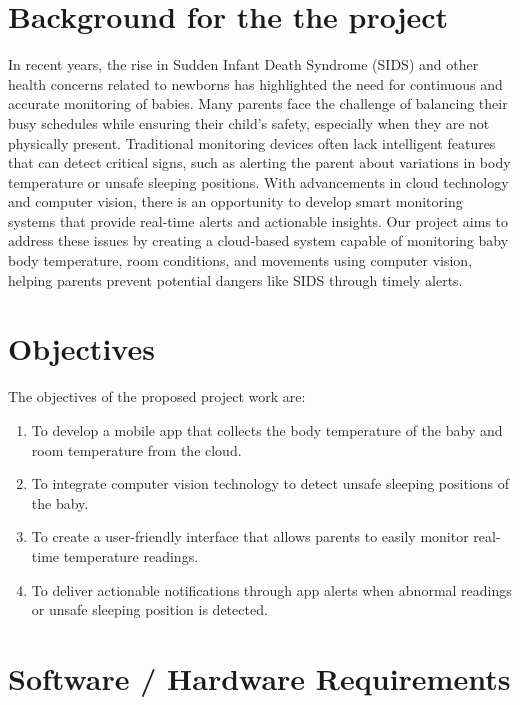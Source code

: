 \documentclass[12pt,a4paper]{report}
\begin{document}
\section*{Background for the  the project}
In recent years, the rise in Sudden Infant Death Syndrome (SIDS)
 and other health concerns related to newborns has highlighted 
 the need for continuous and accurate monitoring of babies\cite{1}. 
 Many parents face the challenge of balancing their busy 
 schedules while ensuring their child’s safety, especially when 
 they are not physically present. Traditional monitoring devices
  often lack intelligent features that can detect critical signs,
   such as alerting the parent about variations in body temperature or unsafe sleeping positions. With 
   advancements in cloud technology and computer vision, there 
   is an opportunity to develop smart monitoring systems that 
   provide real-time alerts and actionable insights. Our project aims to address these issues by 
   creating a cloud-based system capable of monitoring baby 
   body temperature, room conditions, and movements using 
   computer vision, helping parents prevent potential dangers 
   like SIDS through timely alerts.

\section*{Objectives }
The objectives of the proposed project work are:
\begin{enumerate}
    \item To develop a mobile app that collects the body temperature of the baby and room temperature from the cloud.
    \item To integrate computer vision technology to detect unsafe sleeping positions of the baby.
    \item To create a user-friendly interface that allows parents to easily monitor real-time temperature readings.
    \item To deliver actionable notifications through app alerts when abnormal readings or unsafe sleeping position is detected.
\end{enumerate}

\section*{Software / Hardware Requirements}
\end{document}
